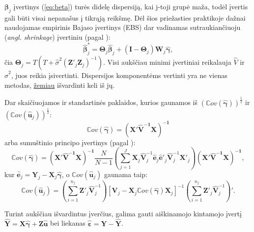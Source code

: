 \documentclass[12pt,a4paper]{article}
\begin{document}
$\boldsymbol{\beta}_j$ įvertinys (\ref{eq:beta}) turės didelę dispersiją, kai j-toji grupė maža, todėl įvertis gali būti visai nepanašus į tikrąją reikšmę. Dėl šios priežasties praktikoje dažnai naudojamas empirinis Bajaso įvertinys (EBS) dar vadinamas sutraukiančiuoju (\textit{angl. shrinkage}) įvertiniu (pagal \cite{shrinkage}):
\begin{equation}
\boldsymbol{\hat{\beta}}^*_{j}=\boldsymbol{\Theta}_j\boldsymbol{\hat{\beta}}_j+(\boldsymbol{I} - \boldsymbol{\Theta}_j)\mathbf{W}_j\boldsymbol{\hat{\gamma}},
\end{equation}
čia $\mathbf{\Theta}_j=T\left(T+\hat{\sigma}^2(\mathbf{Z}'_j\mathbf{Z}_j)^{-1}\right)$. Visi aukščiau minimi įvertiniai reikalauja $\hat{V}$ ir $\hat{\sigma}^2$, juos reikia įsivertinti. Dispersijos komponentėms vertinti yra ne vienas metodas, \hyperlink{reml}{žemiau} išvardinti keli iš jų.

\indent Dar skaičiuojamos ir standartinės paklaidos, kurios gaunamos iš $(\mathbb{C}ov(\boldsymbol{\hat{\gamma}}))^{\frac{1}{2}}$ ir $(\mathbb{C}ov(\mathbf{\hat{u}}_j))^{\frac{1}{2}}$:
\begin{equation}
\mathbb{C}ov(\boldsymbol{\hat{\gamma}})=\mathbf{(X'\hat{V}^{-1}X)^{-1}}
\end{equation}
arba sumuštinio principo įvertinys (pagal \cite{sandwich}):
\begin{equation}
\mathbb{C}ov(\boldsymbol{\hat{\gamma}})=\mathbf{(X'\hat{V}^{-1}X)^{-1}}\frac{N}{N-1}\left(\sum^J_{j=1}\mathbf{X}_j\mathbf{\hat{V}}^{-1}_j\mathbf{\hat{e}}_j\mathbf{\hat{e}}'_j \mathbf{\hat{V}}^{-1}_j\mathbf{X}'_j\right)\mathbf{(X'\hat{V}^{-1}X)^{-1}},
\end{equation}
kur $\mathbf{\hat{e}}_j=\mathbf{Y}_j-\mathbf{X}_j\boldsymbol{\hat{\gamma}}$, o $\mathbb{C}ov(\mathbf{\hat{u}}_j)$ gaunama taip:
\begin{equation}
\mathbb{C}ov(\mathbf{\hat{u}}_j)=\left(\sum^{n_j}_{i=1}\mathbf{Z}'_j\mathbf{\hat{V}}^{-1}_j\right) \left[\mathbf{V}_j-\mathbf{X}_j\mathbb{C}ov(\boldsymbol{\hat{\gamma}})\mathbf{X}_j\right]^{-1} \left(\sum^{n_j}_{i=1}\mathbf{Z}'_j\mathbf{\hat{V}}^{-1}_j\right)'.
\end{equation}

\indent Turint aukščiau išvardintus įverčius, galima gauti aiškinamojo kintamojo įvertį $\mathbf{\hat{Y}}=\mathbf{X}\boldsymbol{\hat{\gamma}}+\mathbf{Z\hat{u}}$ bei liekanas $\boldsymbol{\hat{\varepsilon}}=\mathbf{Y}-\mathbf{\hat{Y}}$.
\end{document}
